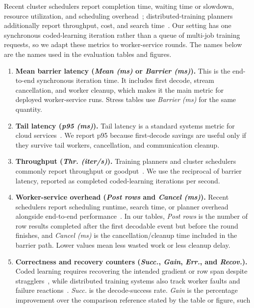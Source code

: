 Recent cluster schedulers report completion time, waiting time or slowdown,
resource utilization, and scheduling overhead~\cite{dongare2025rltune};
distributed-training planners additionally report throughput, cost, and search
time~\cite{strati2025sailor}.  Our setting has one synchronous coded-learning
iteration rather than a queue of multi-job training requests, so we adapt these
metrics to worker-service rounds.  The names below are the names used in the
evaluation tables and figures.
\begin{enumerate}
\setlength{\itemsep}{2pt}
\item \textbf{Mean barrier latency (\emph{Mean (ms)} or \emph{Barrier (ms)}).}
This is the end-to-end synchronous iteration time.  It includes first decode,
stream cancellation, and worker cleanup, which makes it the main metric for
deployed worker-service runs.  Stress tables use \emph{Barrier (ms)} for the
same quantity.
\item \textbf{Tail latency (\emph{p95 (ms)}).}  Tail latency is a standard
systems metric for cloud services~\cite{dean2013tail}.  We report p95 because
first-decode savings are useful only if they survive tail workers,
cancellation, and communication cleanup.
\item \textbf{Throughput (\emph{Thr. (iter/s)}).}  Training planners and cluster schedulers
commonly report throughput or goodput~\cite{strati2025sailor,qiao2021pollux}.
We use the reciprocal of barrier latency, reported as completed coded-learning
iterations per second.
\item \textbf{Worker-service overhead (\emph{Post rows} and \emph{Cancel (ms)}).}
Recent schedulers report scheduling runtime, search time, or planner overhead
alongside end-to-end performance~\cite{dongare2025rltune,strati2025sailor}.  In
our tables, \emph{Post rows} is the number of row results completed after the
first decodable event but before the round finishes, and \emph{Cancel (ms)} is
the cancellation/cleanup time included in the barrier path.  Lower values mean
less wasted work or less cleanup delay.
\item \textbf{Correctness and recovery counters (\emph{Succ.}, \emph{Gain},
\emph{Err.}, and \emph{Recov.}).}  Coded learning requires recovering the
intended gradient or row span despite
stragglers~\cite{tandon2017gradient,zhang2025sparseflexible}, while distributed
training systems also track worker faults and failure reactions~\cite{deng2025minder}.
\emph{Succ.} is the decode-success rate.  \emph{Gain} is the percentage
improvement over the comparison reference stated by the table or figure, such

\end{enumerate}
